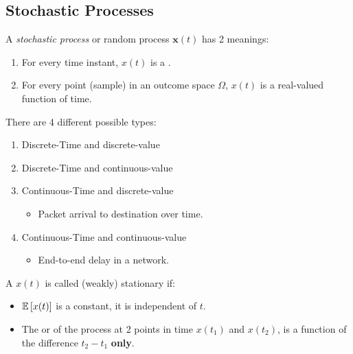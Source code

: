 \subsection{Stochastic Processes}\label{subsec:Stochastic_Processes}
\begin{definition}\label{def:Stochastic_Process}
  A \emph{stochastic process} or random process $\mathbf{x}(t)$ has 2 meanings:
  \begin{enumerate}[noitemsep]
  \item For every time instant, $x(t)$ is a .
  \item For every point (sample) in an outcome space $\Omega$, $x(t)$ is a real-valued function of time.
  \end{enumerate}

  There are 4 different possible types:
  \begin{enumerate}[noitemsep]
  \item Discrete-Time and discrete-value
  \item Discrete-Time and continuous-value
  \item Continuous-Time and discrete-value
    \begin{itemize}[noitemsep]
    \item Packet arrival to destination over time.
    \end{itemize}
  \item Continuous-Time and continuous-value
    \begin{itemize}
    \item End-to-end delay in a network.
    \end{itemize}
  \end{enumerate}
\end{definition}

\begin{definition}\label{def:Stationary_Process}
  A  $x(t)$ is called (weakly) stationary if:
  \begin{itemize}[noitemsep]
  \item $\operatorname{\operatorname{\mathbb{E}}} \left[ x(t) \right]$ is a constant, it is independent of $t$.
  \item The  or  of the process at 2 points in time $x(t_{1})$ and $x(t_{2})$, is a function of the difference $t_{2}-t_{1}$ \textbf{only}.
  \end{itemize}
\end{definition}
